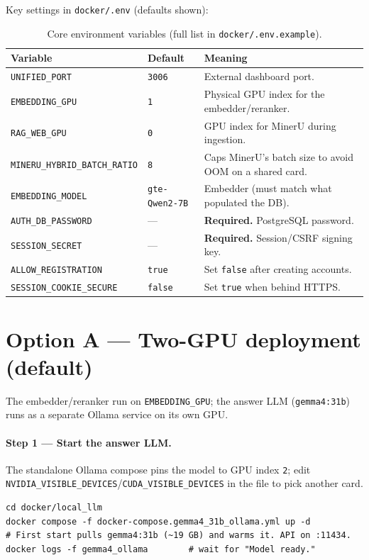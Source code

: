\documentclass[11pt,a4paper]{article}
\newcommand{\code}[1]{\texttt{\small #1}}
\begin{document}
\noindent Key settings in \code{docker/.env} (defaults shown):
\begin{table}[H]
\centering\small
\renewcommand{\arraystretch}{1.2}
\begin{tabular}{>{\raggedright\arraybackslash}p{4.2cm}
                >{\raggedright\arraybackslash}p{3.0cm}
                >{\raggedright\arraybackslash}p{6.0cm}}
\toprule
\textbf{Variable} & \textbf{Default} & \textbf{Meaning} \\
\midrule
\code{UNIFIED\_PORT}        & \code{3006} & External dashboard port. \\
\code{EMBEDDING\_GPU}       & \code{1}    & Physical GPU index for the embedder/reranker. \\
\code{RAG\_WEB\_GPU}        & \code{0}    & GPU index for MinerU during ingestion. \\
\code{MINERU\_HYBRID\_BATCH\_RATIO} & \code{8} & Caps MinerU's batch size to avoid OOM on a shared card. \\
\code{EMBEDDING\_MODEL}     & \code{gte-Qwen2-7B} & Embedder (must match what populated the DB). \\
\code{AUTH\_DB\_PASSWORD}   & --- & \textbf{Required.} PostgreSQL password. \\
\code{SESSION\_SECRET}      & --- & \textbf{Required.} Session/CSRF signing key. \\
\code{ALLOW\_REGISTRATION}  & \code{true} & Set \code{false} after creating accounts. \\
\code{SESSION\_COOKIE\_SECURE} & \code{false} & Set \code{true} when behind HTTPS. \\
\bottomrule
\end{tabular}
\caption{Core environment variables (full list in \code{docker/.env.example}).}
\label{tab:env}
\end{table}

\section{Option A --- Two-GPU deployment (default)}\label{sec:twogpu}
The embedder/reranker run on \code{EMBEDDING\_GPU}; the answer LLM
(\code{gemma4:31b}) runs as a separate Ollama service on its own GPU.

\paragraph{Step 1 --- Start the answer LLM.}
The standalone Ollama compose pins the model to GPU index \code{2}; edit
\code{NVIDIA\_VISIBLE\_DEVICES}/\code{CUDA\_VISIBLE\_DEVICES} in the file to pick
another card.
\begin{lstlisting}
cd docker/local_llm
docker compose -f docker-compose.gemma4_31b_ollama.yml up -d
# First start pulls gemma4:31b (~19 GB) and warms it. API on :11434.
docker logs -f gemma4_ollama        # wait for "Model ready."
\end{lstlisting}
\end{document}
